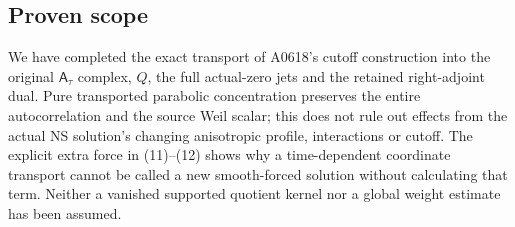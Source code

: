 \subsection{Proven scope}\label{proven-scope}

We have completed the exact transport of A0618's cutoff construction
into the original \(\mathsf A_\tau\) complex, \(Q\), the full
actual-zero jets and the retained right-adjoint dual. Pure transported
parabolic concentration preserves the entire autocorrelation and the
source Weil scalar; this does not rule out effects from the actual NS
solution's changing anisotropic profile, interactions or cutoff. The
explicit extra force in (11)--(12) shows why a time-dependent coordinate
transport cannot be called a new smooth-forced solution without
calculating that term. Neither a vanished supported quotient kernel nor
a global weight estimate has been assumed.
